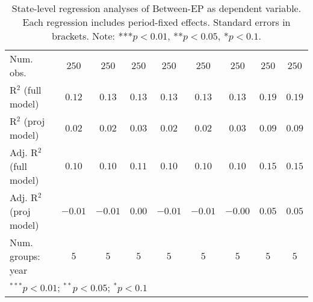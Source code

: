 \begin{table}
\begin{center}
\begin{tabular}{l c c c c c c c c}
\hline
Num. obs.                         & $250$    & $250$    & $250$    & $250$    & $250$    & $250$    & $250$       & $250$       \\
R$^2$ (full model)                & $0.12$   & $0.13$   & $0.13$   & $0.13$   & $0.13$   & $0.13$   & $0.19$      & $0.19$      \\
R$^2$ (proj model)                & $0.02$   & $0.02$   & $0.03$   & $0.02$   & $0.02$   & $0.03$   & $0.09$      & $0.09$      \\
Adj. R$^2$ (full model)           & $0.10$   & $0.10$   & $0.11$   & $0.10$   & $0.10$   & $0.10$   & $0.15$      & $0.15$      \\
Adj. R$^2$ (proj model)           & $-0.01$  & $-0.01$  & $0.00$   & $-0.01$  & $-0.01$  & $-0.00$  & $0.05$      & $0.05$      \\
Num. groups: year                 & $5$      & $5$      & $5$      & $5$      & $5$      & $5$      & $5$         & $5$         \\
\hline
\multicolumn{9}{l}{\scriptsize{$^{***}p<0.01$; $^{**}p<0.05$; $^{*}p<0.1$}}
\end{tabular}
\caption{State-level regression analyses of Between-EP as dependent variable. Each regression includes period-fixed effects. Standard errors in brackets. Note: ***$p<0.01$, **$p<0.05$, *$p<0.1$.}
\label{tab:between_epi_3}
\end{center}
\end{table}

